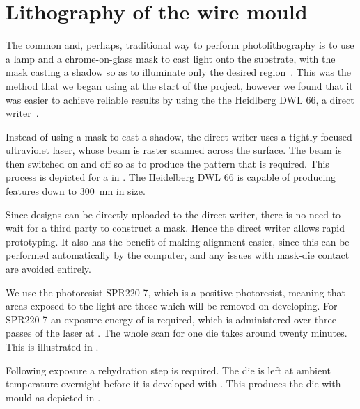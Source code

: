 \section{Lithography of the wire mould}

The common and, perhaps, traditional way to perform photolithography is to use
a  lamp and a chrome-on-glass mask to cast light onto the
substrate, with the mask casting a shadow so as to illuminate only the desired
region~\cite{Madou2002}. This was the method that we began using at the start of the
project, however we found that it was easier to achieve reliable results by
using the the Heidlberg DWL 66, a direct writer~\cite{}. 

Instead of using a mask to cast a shadow, the direct writer uses a tightly
focused ultraviolet laser, whose beam is raster scanned across the surface. The
beam is then switched on and off so as to produce the pattern that is required.
This process is depicted for a in . The Heidelberg
DWL 66 is capable of producing features down to \SI{300}{\nano\meter} in size.

Since designs can be directly uploaded to the direct writer, there is no need
to wait for a third party to construct a mask.  Hence the direct writer allows
rapid prototyping. It also has the benefit of making alignment easier, since
this can be performed automatically by the computer, and any issues with
mask-die contact are avoided entirely. 

We use the photoresist  SPR220-7, which is a positive photoresist,
meaning that areas exposed to the light are those which will be removed on
developing. For  SPR220-7 an exposure energy of  is required,
which is administered over three passes of the laser at . The
whole scan for one die takes around twenty minutes. This is illustrated in
.

Following exposure a rehydration step is required. The die is left at
ambient temperature overnight before it is developed with . This produces the die with mould as depicted in
.

